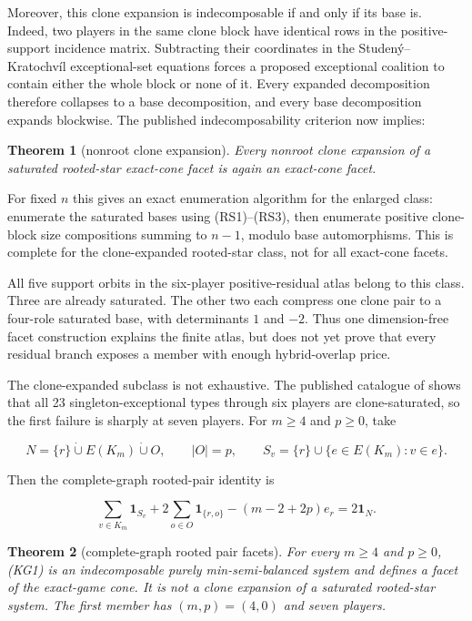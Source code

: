 \documentclass[11pt]{article}
\newtheorem{theorem}{Theorem}
\newcommand{\one}{\mathbf 1}
\begin{document}
Moreover, this clone expansion is indecomposable if and only if its base is.
Indeed, two players in the same clone block have identical rows in the
positive-support incidence matrix.  Subtracting their coordinates in the
Studen\'y--Kratochv\'il exceptional-set equations forces a proposed
exceptional coalition to contain either the whole block or none of it.
Every expanded decomposition therefore collapses to a base decomposition,
and every base decomposition expands blockwise.  The published
indecomposability criterion now implies:

\begin{theorem}[nonroot clone expansion]
Every nonroot clone expansion of a saturated rooted-star exact-cone facet is
again an exact-cone facet.
\end{theorem}

For fixed $n$ this gives an exact enumeration algorithm for the enlarged
class: enumerate the saturated bases using (RS1)--(RS3), then enumerate
positive clone-block size compositions summing to $n-1$, modulo base
automorphisms.  This is complete for the clone-expanded rooted-star class,
not for all exact-cone facets.

All five support orbits in the six-player positive-residual atlas belong to
this class.  Three are already saturated.  The other two each compress one
clone pair to a four-role saturated base, with determinants $1$ and $-2$.
Thus one dimension-free facet construction explains the finite atlas, but
does not yet prove that every residual branch exposes a member with enough
hybrid-overlap price.

The clone-expanded subclass is not exhaustive.  The published catalogue of
\citet{StudenyKratochvil2022} shows that all 23 singleton-exceptional
types through six players are clone-saturated, so the first failure is
sharply at seven players.  For $m\ge4$ and $p\ge0$, take

\[
 N=\{r\}\mathbin{\dot\cup}E(K_m)\mathbin{\dot\cup}O,\qquad |O|=p,
 \qquad S_v=\{r\}\cup\{e\in E(K_m):v\in e\}.
\]

Then the complete-graph rooted-pair identity is

\[
 \sum_{v\in K_m}\one_{S_v}+2\sum_{o\in O}\one_{\{r,o\}}
 -(m-2+2p)e_r=2\one_N.                              \tag{KG1}
\]

\begin{theorem}[complete-graph rooted pair facets]
For every $m\ge4$ and $p\ge0$, (KG1) is an indecomposable purely
min-semi-balanced system and defines a facet of the exact-game cone.  It is
not a clone expansion of a saturated rooted-star system.  The first member
has $(m,p)=(4,0)$ and seven players.
\end{theorem}
\end{document}
